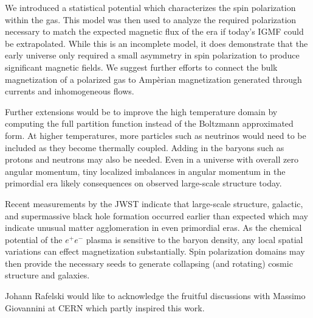 \documentclass[aps,prd,floatfix,reprint]{revtex4-2}
\begin{document}
We introduced a statistical potential which characterizes the spin polarization within the gas. This model was then used to analyze the required polarization necessary to match the expected magnetic flux of the era if today's IGMF could be extrapolated. While this is an incomplete model, it does demonstrate that the early universe only required a small asymmetry in spin polarization to produce significant magnetic fields. We suggest further efforts to connect the bulk magnetization of a polarized gas to Amp{\`e}rian magnetization generated through currents and inhomogeneous flows. 

Further extensions would be to improve the high temperature domain by computing the full partition function instead of the Boltzmann approximated form. At higher temperatures, more particles such as neutrinos would need to be included as they become thermally coupled. Adding in the baryons such as protons and neutrons may also be needed. Even in a universe with overall zero angular momentum, tiny localized imbalances in angular momentum in the primordial era likely consequences on observed large-scale structure today. 

Recent measurements by the JWST indicate that large-scale structure, galactic, and supermassive black hole formation occurred earlier than expected which may indicate unusual matter agglomeration in even primordial eras. As the chemical potential of the $e^{+}e^{-}$ plasma is sensitive to the baryon density, any local spatial variations can effect magnetization substantially. Spin polarization domains may then provide the necessary seeds to generate collapsing (and rotating) cosmic structure and galaxies.

\acknowledgments
\label{sec:ack}
\noindent Johann Rafelski would like to acknowledge the fruitful discussions with Massimo Giovannini at CERN which partly inspired this work. 



\end{document}

